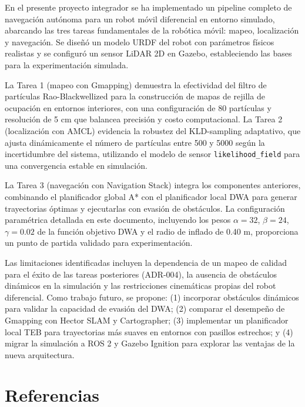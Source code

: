 \documentclass[12pt,letterpaper]{article}
\begin{document}
En el presente proyecto integrador se ha implementado un pipeline completo de navegación autónoma para un robot móvil diferencial en entorno simulado, abarcando las tres tareas fundamentales de la robótica móvil: mapeo, localización y navegación. Se diseñó un modelo URDF del robot con parámetros físicos realistas y se configuró un sensor LiDAR 2D en Gazebo, estableciendo las bases para la experimentación simulada.

La Tarea 1 (mapeo con Gmapping) demuestra la efectividad del filtro de partículas Rao-Blackwellized para la construcción de mapas de rejilla de ocupación en entornos interiores, con una configuración de 80 partículas y resolución de 5 cm que balancea precisión y costo computacional. La Tarea 2 (localización con AMCL) evidencia la robustez del KLD-sampling adaptativo, que ajusta dinámicamente el número de partículas entre 500 y 5000 según la incertidumbre del sistema, utilizando el modelo de sensor \texttt{likelihood\_field} para una convergencia estable en simulación.

La Tarea 3 (navegación con Navigation Stack) integra los componentes anteriores, combinando el planificador global A* con el planificador local DWA para generar trayectorias óptimas y ejecutarlas con evasión de obstáculos. La configuración paramétrica detallada en este documento, incluyendo los pesos $\alpha=32$, $\beta=24$, $\gamma=0.02$ de la función objetivo DWA y el radio de inflado de 0.40 m, proporciona un punto de partida validado para experimentación.

Las limitaciones identificadas incluyen la dependencia de un mapeo de calidad para el éxito de las tareas posteriores (ADR-004), la ausencia de obstáculos dinámicos en la simulación y las restricciones cinemáticas propias del robot diferencial. Como trabajo futuro, se propone: (1) incorporar obstáculos dinámicos para validar la capacidad de evasión del DWA; (2) comparar el desempeño de Gmapping con Hector SLAM y Cartographer; (3) implementar un planificador local TEB para trayectorias más suaves en entornos con pasillos estrechos; y (4) migrar la simulación a ROS 2 y Gazebo Ignition para explorar las ventajas de la nueva arquitectura.

\section*{Referencias}
\end{document}
